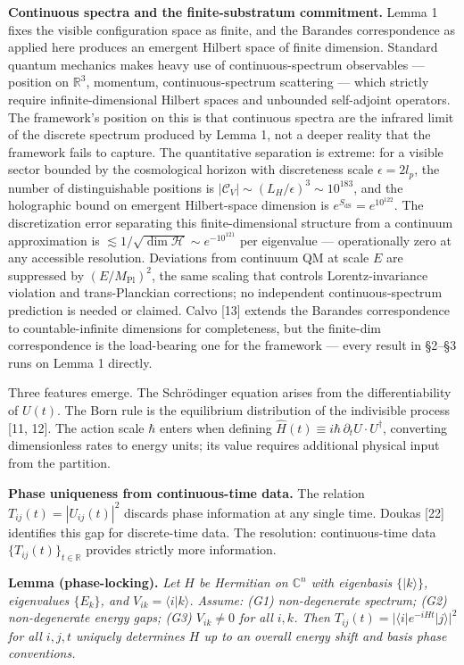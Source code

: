 \documentclass[
]{article}
\begin{document}
\textbf{Continuous spectra and the finite-substratum commitment.} Lemma
1 fixes the visible configuration space as finite, and the Barandes
correspondence as applied here produces an emergent Hilbert space of
finite dimension. Standard quantum mechanics makes heavy use of
continuous-spectrum observables --- position on \(\mathbb{R}^3\),
momentum, continuous-spectrum scattering --- which strictly require
infinite-dimensional Hilbert spaces and unbounded self-adjoint
operators. The framework's position on this is that continuous spectra
are the infrared limit of the discrete spectrum produced by Lemma 1, not
a deeper reality that the framework fails to capture. The quantitative
separation is extreme: for a visible sector bounded by the cosmological
horizon with discreteness scale \(\epsilon = 2 l_p\), the number of
distinguishable positions is
\(|\mathcal{C}_V| \sim (L_H/\epsilon)^3 \sim 10^{183}\), and the
holographic bound on emergent Hilbert-space dimension is
\(e^{S_{\text{dS}}} = e^{10^{122}}\). The discretization error
separating this finite-dimensional structure from a continuum
approximation is
\(\lesssim 1/\sqrt{\dim \mathcal{H}} \sim e^{-10^{121}}\) per eigenvalue
--- operationally zero at any accessible resolution. Deviations from
continuum QM at scale \(E\) are suppressed by \((E/M_{\text{Pl}})^2\),
the same scaling that controls Lorentz-invariance violation and
trans-Planckian corrections; no independent continuous-spectrum
prediction is needed or claimed. Calvo {[}13{]} extends the Barandes
correspondence to countable-infinite dimensions for completeness, but
the finite-dim correspondence is the load-bearing one for the framework
--- every result in §2--§3 runs on Lemma 1 directly.

Three features emerge. The Schrödinger equation arises from the
differentiability of \(U(t)\). The Born rule is the equilibrium
distribution of the indivisible process {[}11, 12{]}. The action scale
\(\hbar\) enters when defining
\(\hat{H}(t) \equiv i\hbar \, \partial_t U \cdot U^\dagger\), converting
dimensionless rates to energy units; its value requires additional
physical input from the partition.

\textbf{Phase uniqueness from continuous-time data.} The relation
\(T_{ij}(t) = |U_{ij}(t)|^2\) discards phase information at any single
time. Doukas {[}22{]} identifies this gap for discrete-time data. The
resolution: continuous-time data \(\{T_{ij}(t)\}_{t \in \mathbb{R}}\)
provides strictly more information.

\textbf{Lemma (phase-locking).} \emph{Let \(H\) be Hermitian on
\(\mathbb{C}^n\) with eigenbasis \(\{|k\rangle\}\), eigenvalues
\(\{E_k\}\), and \(V_{ik} = \langle i | k \rangle\). Assume: (G1)
non-degenerate spectrum; (G2) non-degenerate energy gaps; (G3)
\(V_{ik} \neq 0\) for all \(i, k\). Then
\(T_{ij}(t) = |\langle i | e^{-iHt} | j \rangle|^2\) for all \(i, j, t\)
uniquely determines \(H\) up to an overall energy shift and basis phase
conventions.}
\end{document}
